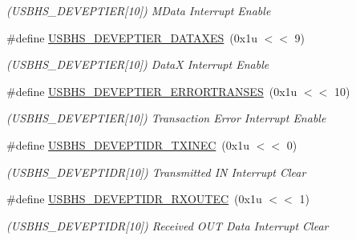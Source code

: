 \begin{DoxyCompactItemize}
\begin{DoxyCompactList}\small\item\em (U\+S\+B\+H\+S\+\_\+\+D\+E\+V\+E\+P\+T\+I\+ER\mbox{[}10\mbox{]}) M\+Data Interrupt Enable \end{DoxyCompactList}\item 
\mbox{\label{group__SAMS70__USBHS_ga0162e1889ef91809937c8e0bd91d1a68}} 
\#define \mbox{\hyperlink{group__SAMS70__USBHS_ga0162e1889ef91809937c8e0bd91d1a68}{U\+S\+B\+H\+S\+\_\+\+D\+E\+V\+E\+P\+T\+I\+E\+R\+\_\+\+D\+A\+T\+A\+X\+ES}}~(0x1u $<$$<$ 9)
\begin{DoxyCompactList}\small\item\em (U\+S\+B\+H\+S\+\_\+\+D\+E\+V\+E\+P\+T\+I\+ER\mbox{[}10\mbox{]}) DataX Interrupt Enable \end{DoxyCompactList}\item 
\mbox{\label{group__SAMS70__USBHS_gab8a4312a4fef51e62f9bc659228378e2}} 
\#define \mbox{\hyperlink{group__SAMS70__USBHS_gab8a4312a4fef51e62f9bc659228378e2}{U\+S\+B\+H\+S\+\_\+\+D\+E\+V\+E\+P\+T\+I\+E\+R\+\_\+\+E\+R\+R\+O\+R\+T\+R\+A\+N\+S\+ES}}~(0x1u $<$$<$ 10)
\begin{DoxyCompactList}\small\item\em (U\+S\+B\+H\+S\+\_\+\+D\+E\+V\+E\+P\+T\+I\+ER\mbox{[}10\mbox{]}) Transaction Error Interrupt Enable \end{DoxyCompactList}\item 
\mbox{\label{group__SAMS70__USBHS_ga7b395bca7982f0492694c66539197454}} 
\#define \mbox{\hyperlink{group__SAMS70__USBHS_ga7b395bca7982f0492694c66539197454}{U\+S\+B\+H\+S\+\_\+\+D\+E\+V\+E\+P\+T\+I\+D\+R\+\_\+\+T\+X\+I\+N\+EC}}~(0x1u $<$$<$ 0)
\begin{DoxyCompactList}\small\item\em (U\+S\+B\+H\+S\+\_\+\+D\+E\+V\+E\+P\+T\+I\+DR\mbox{[}10\mbox{]}) Transmitted IN Interrupt Clear \end{DoxyCompactList}\item 
\mbox{\label{group__SAMS70__USBHS_ga3b95dfd74fd8bec25a27705437795a3c}} 
\#define \mbox{\hyperlink{group__SAMS70__USBHS_ga3b95dfd74fd8bec25a27705437795a3c}{U\+S\+B\+H\+S\+\_\+\+D\+E\+V\+E\+P\+T\+I\+D\+R\+\_\+\+R\+X\+O\+U\+T\+EC}}~(0x1u $<$$<$ 1)
\begin{DoxyCompactList}\small\item\em (U\+S\+B\+H\+S\+\_\+\+D\+E\+V\+E\+P\+T\+I\+DR\mbox{[}10\mbox{]}) Received O\+UT Data Interrupt Clear \end{DoxyCompactList}\item 

\end{DoxyCompactItemize}
